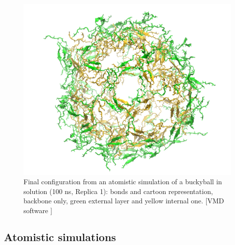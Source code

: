 \begin{figure}[t]
\centering
\includegraphics[width=0.5\linewidth]{3results_capsule/pics/staR3_render}
\caption[Atomistic simulations of buckyball in solution: final configuration]{Final configuration from an atomistic simulation of a buckyball in solution (100 ns, Replica 1): bonds and cartoon representation, backbone only, green external layer and yellow internal one. [VMD software \citet{HUMP96}]}
\label{fig:BTI_snap}
\end{figure}

\subsection{Atomistic simulations}

